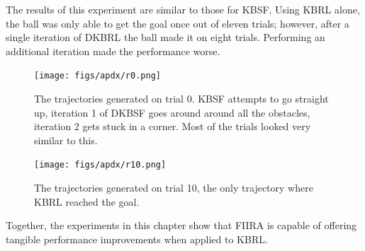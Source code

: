 The results of this experiment are similar to those for KBSF.
Using KBRL alone, the ball was only able to get the goal once out of eleven
trials; however, after a single iteration of DKBRL the ball made it on
eight trials.
Performing an additional iteration made the performance worse.\\

\begin{figure}[!!!ht]
  \centering
    \texttt{[image: figs/apdx/r0.png]}
  \caption[DKBRL on PinBall sample trajectory]{The trajectories generated
on trial 0. KBSF attempts to go straight up,
iteration 1 of DKBSF goes around around all the obstacles,
iteration 2 gets stuck in a corner. Most of the trials looked very similar to this.}
\end{figure}

\begin{figure}[!!!ht]
  \centering
    \texttt{[image: figs/apdx/r10.png]}
  \caption[DKBRL on PinBall sample trajectory 2]{The trajectories generated
on trial 10, the only trajectory where KBRL reached the goal.}
\end{figure}

Together, the experiments in this chapter show that FIIRA is capable of
offering tangible performance improvements when applied to KBRL.